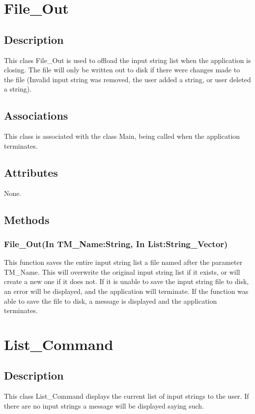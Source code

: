 \documentclass{report}
\begin{document}
    
    
    
    
\section{File\_Out}
	\subsection{Description}
    This class File\_Out is used to offload the input string list when the application is closing. The file will only be written out to disk if there were changes made to the file (Invalid input string was removed, the user added a string, or user deleted a string). 
    \subsection{Associations}
    This class is associated with the class Main, being called when the application terminates.
    \subsection{Attributes}
    None.
    \subsection{Methods} 
    \subsubsection{File\_Out(In TM\_Name:String, In List:String\_Vector)}
    This function saves the entire input string list a file named after the parameter TM\_Name. This will overwrite the original input string list if it exists, or will create a new one if it does not. If it is unable to save the input string file to disk, an error will be displayed, and the application will terminate. If the function was able to save the file to disk, a message is displayed and the application terminates.    
    
    
    
    
    
    
\section{List\_Command}
	\subsection{Description}
    	This class List\_Command displays the current list of input strings to the user. If there are no input strings a message will be displayed saying such.
    
\end{document}
